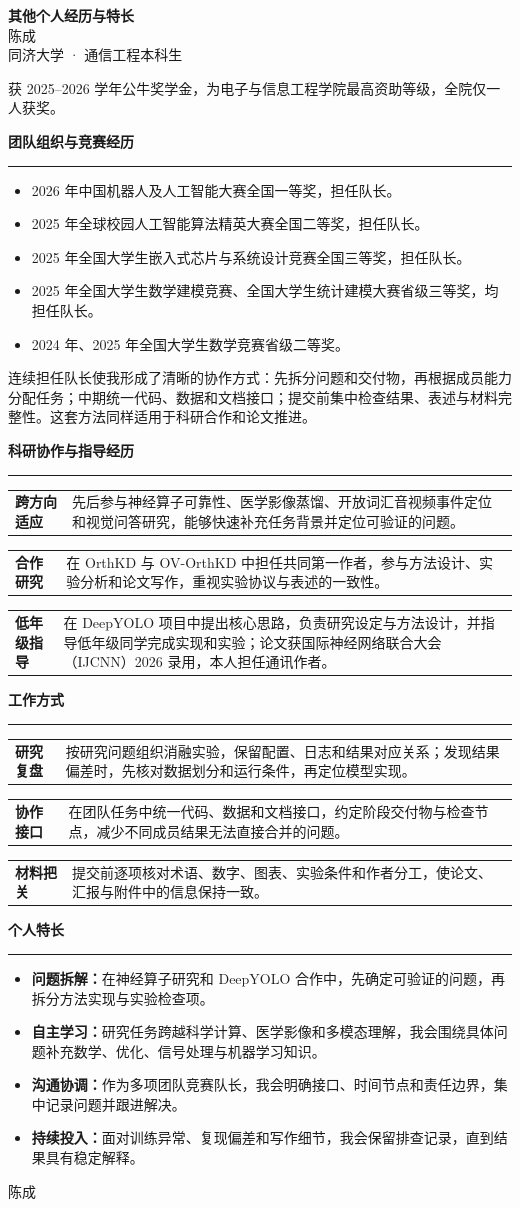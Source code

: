 \documentclass[UTF8,fontset=none,10pt,a4paper]{ctexart}
\makeatletter
\newcommand{\profilesection}[1]{%
  \vspace{8pt}%
  {\large\bfseries\color{accent}#1}\par
  \vspace{-3pt}\textcolor{line}{\rule{\textwidth}{0.65pt}}\vspace{5pt}%
}
\newcommand{\strength}[2]{%
  \begin{tabularx}{\textwidth}{@{}>{\bfseries\color{accent}}p{3.1cm}X@{}}
    #1 & #2
  \end{tabularx}\vspace{5pt}%
}
\makeatother
\begin{document}
\begin{center}
  {\fontsize{24}{28}\selectfont\bfseries\color{accent}其他个人经历与特长}\\[5pt]
  {\large 陈成}\\[2pt]
  {\color{muted}同济大学 · 通信工程本科生}
\end{center}

获 2025--2026 学年公牛奖学金，为电子与信息工程学院最高资助等级，全院仅一人获奖。

\profilesection{团队组织与竞赛经历}

\begin{itemize}
  \item 2026 年中国机器人及人工智能大赛全国一等奖，担任队长。
  \item 2025 年全球校园人工智能算法精英大赛全国二等奖，担任队长。
  \item 2025 年全国大学生嵌入式芯片与系统设计竞赛全国三等奖，担任队长。
  \item 2025 年全国大学生数学建模竞赛、全国大学生统计建模大赛省级三等奖，均担任队长。
  \item 2024 年、2025 年全国大学生数学竞赛省级二等奖。
\end{itemize}

连续担任队长使我形成了清晰的协作方式：先拆分问题和交付物，再根据成员能力分配任务；中期统一代码、数据和文档接口；提交前集中检查结果、表述与材料完整性。这套方法同样适用于科研合作和论文推进。

\profilesection{科研协作与指导经历}

\strength{跨方向适应}{先后参与神经算子可靠性、医学影像蒸馏、开放词汇音视频事件定位和视觉问答研究，能够快速补充任务背景并定位可验证的问题。}
\strength{合作研究}{在 OrthKD 与 OV-OrthKD 中担任共同第一作者，参与方法设计、实验分析和论文写作，重视实验协议与表述的一致性。}
\strength{低年级指导}{在 DeepYOLO 项目中提出核心思路，负责研究设定与方法设计，并指导低年级同学完成实现和实验；论文获国际神经网络联合大会（IJCNN）2026 录用，本人担任通讯作者。}

\profilesection{工作方式}

\strength{研究复盘}{按研究问题组织消融实验，保留配置、日志和结果对应关系；发现结果偏差时，先核对数据划分和运行条件，再定位模型实现。}
\strength{协作接口}{在团队任务中统一代码、数据和文档接口，约定阶段交付物与检查节点，减少不同成员结果无法直接合并的问题。}
\strength{材料把关}{提交前逐项核对术语、数字、图表、实验条件和作者分工，使论文、汇报与附件中的信息保持一致。}

\profilesection{个人特长}

\begin{itemize}
  \item \textbf{问题拆解：}在神经算子研究和 DeepYOLO 合作中，先确定可验证的问题，再拆分方法实现与实验检查项。
  \item \textbf{自主学习：}研究任务跨越科学计算、医学影像和多模态理解，我会围绕具体问题补充数学、优化、信号处理与机器学习知识。
  \item \textbf{沟通协调：}作为多项团队竞赛队长，我会明确接口、时间节点和责任边界，集中记录问题并跟进解决。
  \item \textbf{持续投入：}面对训练异常、复现偏差和写作细节，我会保留排查记录，直到结果具有稳定解释。
\end{itemize}

\vfill
\begin{flushright}
  陈成
\end{flushright}
\end{document}
